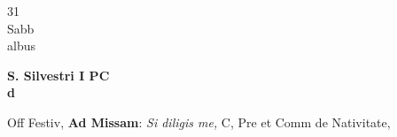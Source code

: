 \documentclass[10pt, openany]{book}
\begin{document}
        \begin{center}
            \begin{minipage}{3.5in}
                \vspace{2em}
                \begin{minipage}{0.5in}
                    {\Huge 31} \\
                    {\normalsize Sabb} \\
                    {\normalsize albus}
                \end{minipage}
                \begin{minipage}{3.0in}
                    \textbf{ \large S. Silvestri I PC \\
                    \textnormal{\normalsize d}} \\ 
                \end{minipage}
                \begin{justify}Off Festiv, \textbf{Ad Missam}: \textit{Si diligis me,} C, Pre et Comm de Nativitate,   
                \end{justify}
            \end{minipage}
        \end{center}
    
\end{document}
